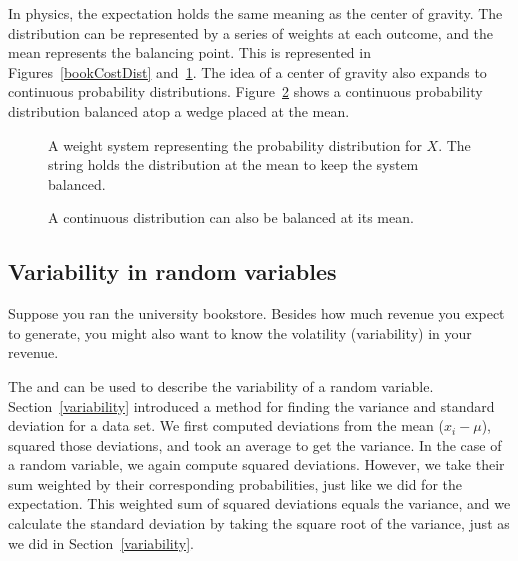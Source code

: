 In physics, the expectation holds the same meaning as the center of gravity. The distribution can be represented by a series of weights at each outcome, and the mean represents the balancing point. This is represented in Figures~\ref{bookCostDist} and~\ref{bookWts}. The idea of a center of gravity also expands to continuous probability distributions. Figure~\ref{contBalance} shows a continuous probability distribution balanced atop a wedge placed at the mean.

\begin{figure}[h]
\centering
{}
\caption{A weight system representing the probability distribution for $X$. The string holds the distribution at the mean to keep the system balanced.}
\label{bookWts}
\end{figure}

\begin{figure}[h]
\centering
{}
\caption{A continuous distribution can also be balanced at its mean.}
\label{contBalance}
\end{figure}




\D{\newpage}

\subsection{Variability in random variables}

Suppose you ran the university bookstore. Besides how much revenue you expect to generate, you might also want to know the volatility (variability) in your revenue.

The  and  can be used to describe the variability of a random variable. Section~\ref{variability}
introduced a method for finding the variance and standard deviation for a data set. We first computed deviations from the mean ($x_i - \mu$), squared those deviations, and took an average to get the variance. In the case of a random variable, we again compute squared deviations. However, we take their sum weighted by their corresponding probabilities, just like we did for the expectation. This weighted sum of squared deviations equals the variance, and we calculate the standard deviation by taking the square root of the variance, just as we did in Section~\ref{variability}.

